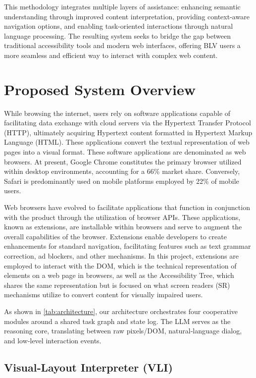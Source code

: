 \documentclass[conference]{IEEEtran}
\begin{document}
This methodology integrates multiple layers of assistance: enhancing semantic understanding through improved content interpretation, providing context-aware navigation options, and enabling task-oriented interactions through natural language processing. The resulting system seeks to bridge the gap between traditional accessibility tools and modern web interfaces, offering BLV users a more seamless and efficient way to interact with complex web content.

\section{Proposed System Overview}\label{system}

While browsing the internet, users rely on software applications capable of facilitating data exchange with cloud servers via the Hypertext Transfer Protocol (HTTP), ultimately acquiring Hypertext content formatted in Hypertext Markup Language (HTML). These applications convert the textual representation of web pages into a visual format. These software applications are denominated as web browsers. At present, Google Chrome constitutes the primary browser utilized within desktop environments, accounting for a 66\% market share. Conversely, Safari is predominantly used on mobile platforms employed by 22\%  of mobile users\cite{browserstats2025}.

Web browsers have evolved to facilitate applications that function in conjunction with the product through the utilization of browser APIs. These applications, known as extensions, are installable within browsers and serve to augment the overall capabilities of the browser. Extensions enable developers to create enhancements for standard navigation, facilitating features such as text grammar correction, ad blockers, and other mechanisms. In this project, extensions are employed to interact with the DOM, which is the technical representation of elements on a web page in browsers, as well as the Accessibility Tree, which shares the same representation but is focused on what screen readers (SR) mechanisms utilize to convert content for visually impaired users.

As shown in \autoref{tab:architecture}, our architecture orchestrates four cooperative modules around a shared task graph and state log. The LLM serves as the reasoning core, translating between raw pixels/DOM, natural‑language dialog, and low‑level interaction events.

\subsection{Visual‑Layout Interpreter (VLI)}
\end{document}

